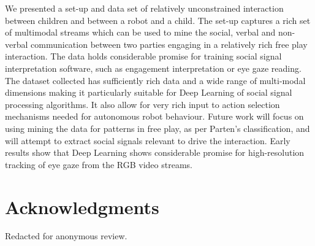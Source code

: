 \documentclass[sigconf]{acmart}
\begin{document}
We presented a set-up and data set of relatively unconstrained interaction
between children and between a robot and a child. The set-up captures a rich set
of multimodal streams which can be used to mine the social, verbal and
non-verbal communication between two parties engaging in a relatively rich free
play interaction. The data holds considerable promise for training social signal
interpretation software, such as engagement interpretation or eye gaze reading.
The dataset collected has sufficiently rich data and a wide range of multi-modal
dimensions making it particularly suitable for Deep Learning of social signal
processing algorithms. It also allow for very rich input to action selection
mechanisms needed for autonomous robot behaviour. Future work will focus on
using mining the data for patterns in free play, as per Parten's classification,
and will attempt to extract social signals relevant to drive the interaction.
Early results show that Deep Learning shows considerable promise for
high-resolution tracking of eye gaze from the RGB video streams.

\section*{Acknowledgments}

Redacted for anonymous review.



\end{document}
